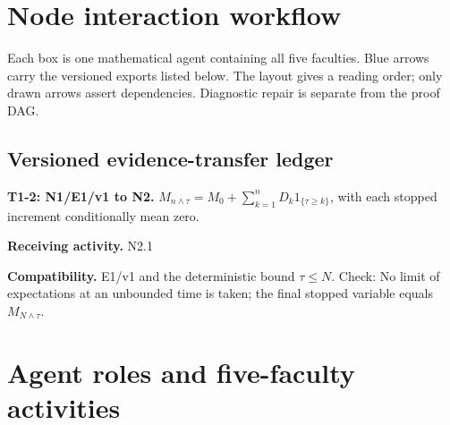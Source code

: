 \documentclass[preprint,12pt,aps,pra,showkeys,amsmath,amssymb,superscriptaddress,floatfix]{revtex4-2}
\theoremstyle{definition}
\theoremstyle{remark}
\newcommand{\field}[2]{\par\smallskip\noindent\textbf{#1.} #2\par}
\begin{document}
\clearpage\section{Node interaction workflow}

\begin{center}\end{center}

Each box is one mathematical agent containing all five faculties. Blue
arrows carry the versioned exports listed below. The layout gives a
reading order; only drawn arrows assert dependencies. Diagnostic repair
is separate from the proof DAG.

\subsection{Versioned evidence-transfer ledger}

\begingroup\small\linespread{1.05}\selectfont

\field{T1-2: N1/E1/v1 to N2}{\(M_{n\wedge\tau}=M_0+\sum_{k=1}^nD_k1_{\{\tau\ge k\}}\), with each
stopped increment conditionally mean zero.}

\field{Receiving activity}{N2.1}

\field{Compatibility}{E1/v1 and the deterministic bound \(\tau\le N\). Check: No limit of
expectations at an unbounded time is taken; the final stopped variable
equals \(M_{N\wedge\tau}\).}

\endgroup

\clearpage\section{Agent roles and five-faculty activities}\begingroup\small\linespread{1.05}\selectfont{}
\end{document}
